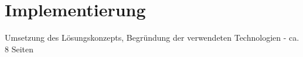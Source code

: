 \chapter{Implementierung}
\thispagestyle{fancy}

Umsetzung des Lösungskonzepts, Begründung der verwendeten Technologien - ca. 8 Seiten